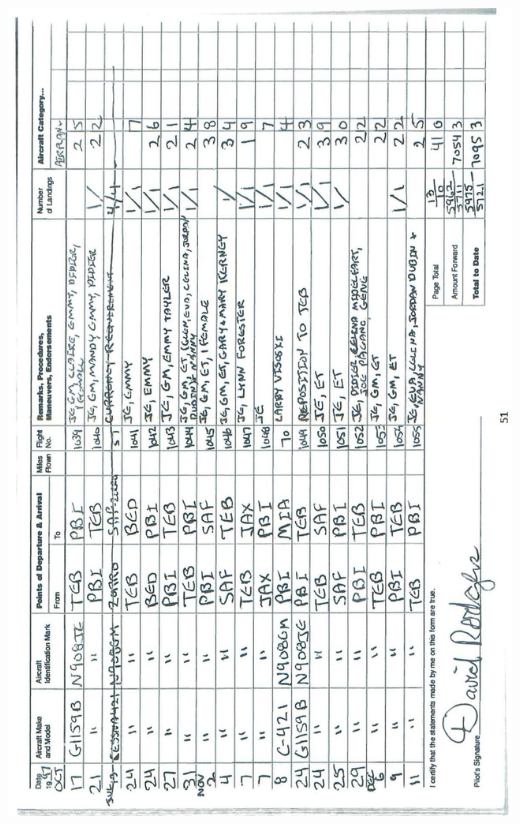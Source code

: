 \documentclass[10pt]{article}
\begin{document}
\includegraphics[max width=\textwidth, center]{2025_02_27_dd68c3d38de88f0516d9g-055}\\
\end{document}
